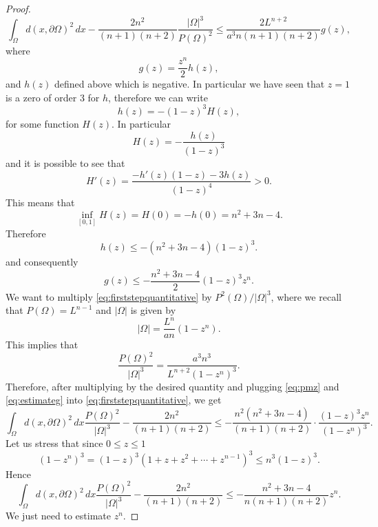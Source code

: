 \documentclass[oneside,a4paper,11pt,notitlepage]{article}
\newcommand{\abs}[1]{{\left|#1\right|}}
\theoremstyle{definition}
\theoremstyle{plain}
\theoremstyle{definition}
\begin{document}
\begin{proof}
\begin{equation}\label{eq:firststepquantitative}
\int_{\Omega} d(x,\partial\Omega)^2\, dx-\frac{2n^2}{(n+1)(n+2)}\frac{\abs{\Omega}^3}{P(\Omega)^2}\le
    \frac{2L^{n+2}}{a^3n(n+1)(n+2)}g(z),
\end{equation}
where
\begin{equation*}
    g(z) = \frac{z^n}{2}h(z),
\end{equation*}
and $h(z)$ defined above which is negative. In particular we have seen that $z=1$ is a zero of order $3$ for $h$, therefore we can write
\begin{equation*}
    h(z) = -(1-z)^3H(z),
\end{equation*}
for some function $H(z)$. In particular 
\begin{equation*}
    H(z) = -\frac{h(z)}{(1-z)^3}
\end{equation*}
and it is possible to see that
\begin{equation*}
    H'(z) = \frac{-h'(z)(1-z)-3h(z)}{(1-z)^4}>0.
\end{equation*}
This means that 
\begin{equation*}
    \inf_{[0,1]}H(z) = H(0) = -h(0)= n^2+3n-4.
\end{equation*}
Therefore
\begin{equation*}
    h(z) \le -(n^2+3n-4)(1-z)^3.
\end{equation*}
and consequently
\begin{equation}\label{eq:estimateg}
    g(z) \le -\frac{n^2+3n-4}{2}(1-z)^3z^n.
\end{equation}
We want to multiply \eqref{eq:firststepquantitative} by $P^2(\Omega)/\abs{\Omega}^3$, where we recall that $P(\Omega) =L^{n-1}$ and $\abs{\Omega}$ is given by 
\begin{equation}\label{eq:measureomegawithz}
    \abs{\Omega}= \frac{L^n}{an}(1-z^n).
\end{equation}
This implies that
\begin{equation}\label{eq:pmz}
    \frac{P(\Omega)^2}{\abs{\Omega}^3}=\frac{a^3n^3}{L^{n+2}(1-z^n)^3}.
\end{equation}
Therefore, after multiplying by the desired quantity and plugging \eqref{eq:pmz} and \eqref{eq:estimateg} into \eqref{eq:firststepquantitative}, we get
\begin{equation*}
    \int_{\Omega} d(x,\partial\Omega)^2\, dx\frac{P(\Omega)^2}{\abs{\Omega}^3}-\frac{2n^2}{(n+1)(n+2)}\le -\frac{n^2(n^2+3n-4)}{(n+1)(n+2)}\cdot\frac{(1-z)^3z^n}{(1-z^n)^3}.
\end{equation*}
Let us stress that since $0\le z\le 1$
\begin{equation*}
    (1-z^n)^3= (1-z)^3(1+z+z^2+\cdots+z^{n-1})^3\le n^3(1-z)^3.
\end{equation*}
Hence
\begin{equation}\label{eq:secondstepquantitative}
   \int_{\Omega} d(x,\partial\Omega)^2\, dx \frac{P(\Omega)^2}{\abs{\Omega}^3}-\frac{2n^2}{(n+1)(n+2)}\le -\frac{n^2+3n-4}{n(n+1)(n+2)} z^n.
\end{equation}
We just need to estimate $z^n$. 


\end{proof}
\end{document}

